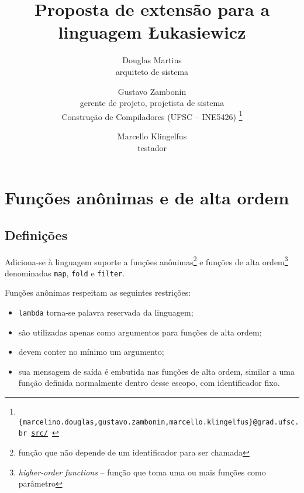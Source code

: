 \documentclass{article}
\title{\textbf{Proposta de extensão para a linguagem Łukasiewicz}}
\author{
    Douglas Martins \\
    {\small arquiteto de sistema}
    \and Gustavo Zambonin \\
    {\small gerente de projeto, projetista de sistema} \vspace{2mm}\\
    {\small Construção de Compiladores (UFSC -- INE5426)}
    \footnote{\texttt{
        \{marcelino.douglas,gustavo.zambonin,marcello.klingelfus\}@grad.ufsc.br
        \hfill \href{https://github.com/zambonin/ufsc-ine5426}{src/}
    }}
    \and Marcello Klingelfus \\
    {\small testador}
}
\date{}
\newenvironment{smallitem}{
    \vspace{-1mm}
    \begin{itemize}
    \setlength{\parskip}{0pt}
    \setlength{\itemsep}{2pt}
}{
    \vspace{-2mm}
    \end{itemize}
}
\begin{document}
\maketitle

\section{Funções anônimas e de alta ordem}

\subsection{Definições}

Adiciona-se à linguagem suporte a funções anônimas\footnote{função que não
depende de um identificador para ser chamada} e funções de alta
ordem\footnote{\emph{higher-order functions} -- função que toma uma ou mais
funções como parâmetro} denominadas \texttt{map}, \texttt{fold} e
\texttt{filter}. \medskip

Funções anônimas respeitam as seguintes restrições:
\begin{smallitem}
    \item \texttt{lambda} torna-se palavra reservada da linguagem;
    \item são utilizadas apenas como argumentos para funções de alta ordem;
    \item devem conter no mínimo um argumento;
    \item sua mensagem de saída é embutida nas funções de alta ordem, similar
        a uma função definida normalmente dentro desse escopo, com
        identificador fixo.
\end{smallitem} \medskip
\end{document}
